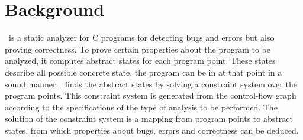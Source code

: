 \section{Background}
\label{sec:background}
\gob\ is a static analyzer for C programs for detecting bugs and errors but also proving correctness. To prove certain properties about the program to be analyzed, it computes abstract states for each program point. These states describe all possible concrete state, the program can be in at that point in a sound manner. \gob\ finds the abstract states by solving a constraint system over the program points. This constraint system is generated from the control-flow graph according to the specifications of the type of analysis to be performed. The solution of the constraint system is a mapping from program points to abstract states, from which properties about bugs, errors and correctness can be deduced.

